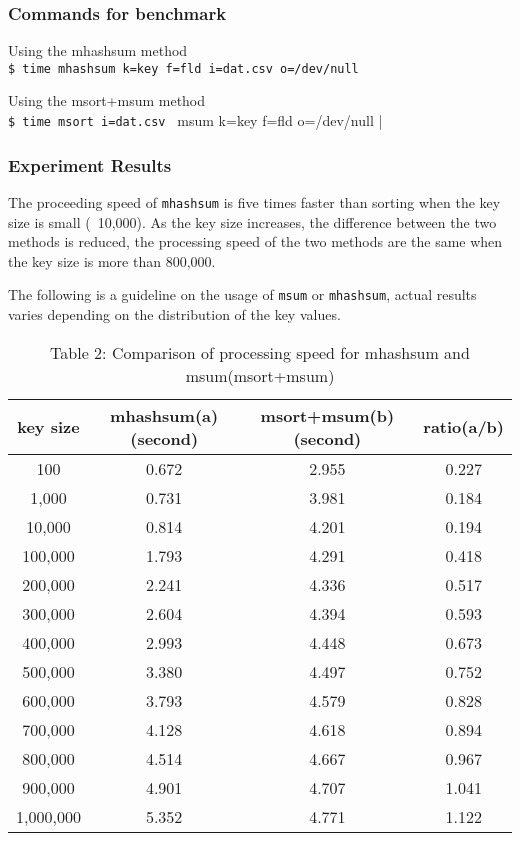 \subsubsection*{Commands for benchmark}
Using the mhashsum method\\
\verb|$ time mhashsum k=key f=fld i=dat.csv o=/dev/null |

Using the msort+msum method\\
\verb|$ time msort i=dat.csv | msum k=key f=fld o=/dev/null |

\subsubsection*{Experiment Results}

The proceeding speed of \verb|mhashsum| is five times faster than sorting when the key size is small (~10,000). 
As the key size increases, the difference between the two methods is reduced, the processing speed of the two methods are the same when the key size is more than 800,000.

The following is a guideline on the usage of \verb|msum| or \verb|mhashsum|, actual results varies depending on the distribution of the key values.

\begin{table}[h]
\begin{center}
 \caption{Table 2: Comparison of processing speed for mhashsum and msum(msort+msum)}
 \begin{tabular}{|c|c|c|c|}
  \hline
key size & mhashsum(a)(second)&msort+msum(b)(second)&ratio(a/b)\\ \hline \hline
100&0.672&2.955&0.227\\ \hline
1,000&0.731&3.981&0.184\\ \hline
10,000&0.814&4.201&0.194\\ \hline
100,000&1.793&4.291&0.418\\ \hline
200,000&2.241&4.336&0.517\\ \hline
300,000&2.604&4.394&0.593\\ \hline
400,000&2.993&4.448&0.673\\ \hline
500,000&3.380&4.497&0.752\\ \hline
600,000&3.793&4.579&0.828\\ \hline
700,000&4.128&4.618&0.894\\ \hline
800,000&4.514&4.667&0.967\\ \hline
900,000&4.901&4.707&1.041\\ \hline
1,000,000&5.352&4.771&1.122\\ \hline
 \end{tabular}
\end{center}
\end{table}

